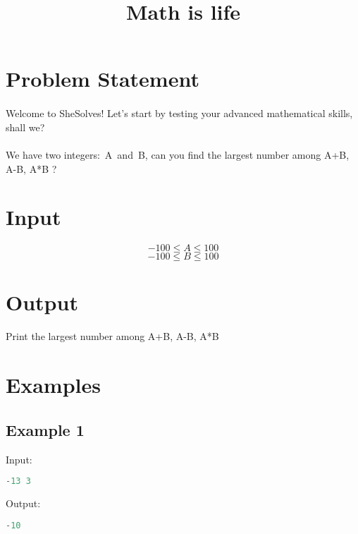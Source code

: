 \documentclass[10pt]{article}
\begin{document}
\title{Math is life}
 \date{}
\maketitle
\section{Problem Statement}
\paragraph{}
Welcome to SheSolves!
Let’s start by testing your advanced mathematical skills, shall we?
\paragraph{}
We have two integers: A and B, can you find the largest number among A+B, A-B, A*B ?
\paragraph{}
\section{Input}
$$ -100\le A \le 100 $$
$$ -100\le B \le 100 $$
\section{Output}
Print the largest number among A+B, A-B, A*B
\section{Examples}
\subsection{Example 1}
Input:
\begin{lstlisting}[language=Python]
-13 3
\end{lstlisting}
Output:
\begin{lstlisting}[language=Python]
-10
\end{lstlisting}
\end{document}
